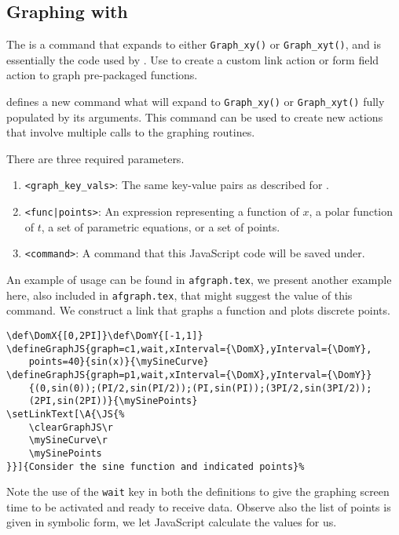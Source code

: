 \documentclass{article}
\begin{document}
\subsection{Graphing with \texorpdfstring{\protect{}}{}}\label{defineGraphJS}

The  is a command that expands to either
\texttt{Graph\_xy()} or \texttt{Graph\_xyt()}, and is essentially
the code used by . Use  to create a
custom link action or form field action to graph pre-packaged
functions.


\begin{dCmd}{\linewidth}
\end{dCmd}

\CmdDescription {} defines a new command
 what will expand to \texttt{Graph\_xy()} or
\texttt{Graph\_xyt()} fully populated by its arguments. This command
can be used to create new actions that involve multiple calls to the
{\AcroFLeX} graphing routines.

\PD There are three required parameters.
\begin{enumerate}
  \item \texttt{<graph\_key\_vals>}: The same key-value pairs as
      described for .
  \item \texttt{<func\string|points>}: An expression representing a
      function of $x$, a polar function of $t$, a set of parametric
      equations, or a set of points.
  \item \texttt{<command>}: A command that this JavaScript code will
      be saved under.
\end{enumerate}

An example of usage can be found in \texttt{afgraph.tex}, we
present another example here, also included in \texttt{afgraph.tex},  that
might suggest the value of this command. We construct a link that
graphs a function and plots discrete points.

\begin{Verbatim}[fontsize=\footnotesize]
\def\DomX{[0,2PI]}\def\DomY{[-1,1]}
\defineGraphJS{graph=c1,wait,xInterval={\DomX},yInterval={\DomY},
    points=40}{sin(x)}{\mySineCurve}
\defineGraphJS{graph=p1,wait,xInterval={\DomX},yInterval={\DomY}}
    {(0,sin(0));(PI/2,sin(PI/2));(PI,sin(PI));(3PI/2,sin(3PI/2));
    (2PI,sin(2PI))}{\mySinePoints}
\setLinkText[\A{\JS{%
    \clearGraphJS\r
    \mySineCurve\r
    \mySinePoints
}}]{Consider the sine function and indicated points}%
\end{Verbatim}
Note the use of the \texttt{wait} key in both the definitions to give the graphing screen
time to be activated and ready to receive data. Observe also the list of points is given
in symbolic form, we let JavaScript calculate the values for us.
\end{document}
